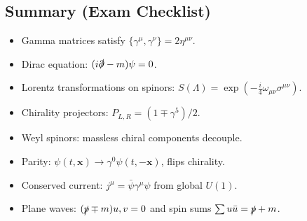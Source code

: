 \subsection{Summary (Exam Checklist)}
\begin{itemize}
\item Gamma matrices satisfy $\{\gamma^\mu,\gamma^\nu\}=2\eta^{\mu\nu}$.
\item Dirac equation: $(i\slashed{\partial}-m)\psi=0$.
\item Lorentz transformations on spinors: $S(\Lambda)=\exp(-\frac{i}{4}\omega_{\mu\nu}\sigma^{\mu\nu})$.
\item Chirality projectors: $P_{L,R}=(1\mp\gamma^5)/2$.
\item Weyl spinors: massless chiral components decouple.
\item Parity: $\psi(t,\mathbf{x})\to \gamma^0\psi(t,-\mathbf{x})$, flips chirality.
\item Conserved current: $j^\mu=\bar{\psi}\gamma^\mu\psi$ from global $U(1)$.
\item Plane waves: $(\slashed{p}\mp m)u,v=0$ and spin sums $\sum u\bar{u}=\slashed{p}+m$.
\end{itemize}
